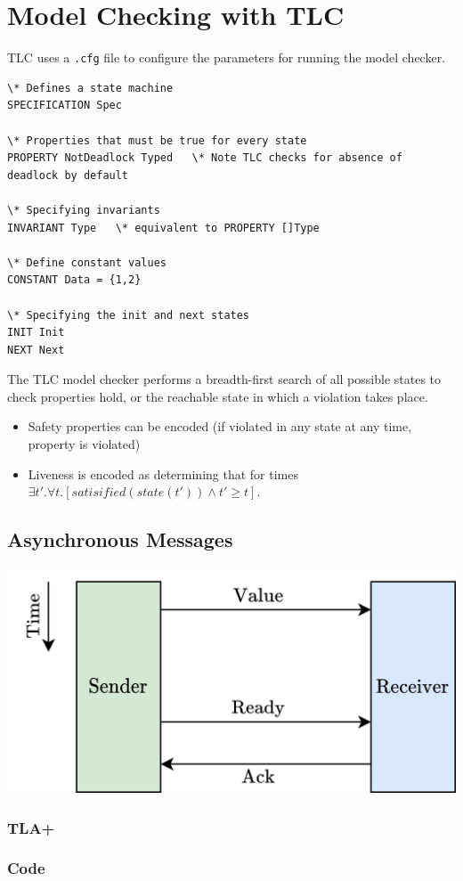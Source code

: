 \section{Model Checking with TLC}
TLC uses a \texttt{.cfg} file to configure the parameters for running the model checker.
\begin{verbatim}
\* Defines a state machine 
SPECIFICATION Spec

\* Properties that must be true for every state
PROPERTY NotDeadlock Typed   \* Note TLC checks for absence of deadlock by default

\* Specifying invariants
INVARIANT Type   \* equivalent to PROPERTY []Type

\* Define constant values
CONSTANT Data = {1,2}

\* Specifying the init and next states
INIT Init
NEXT Next
\end{verbatim}
The TLC model checker performs a breadth-first search of all possible states to check properties hold, or the reachable state in which a violation takes place.
\begin{itemize}
    \item Safety properties can be encoded (if violated in any state at any time, property is violated)
    \item Liveness is encoded as determining that for times $\exists t' . \forall t. [satisified(state(t')) \land t' \geq t]$.
\end{itemize}

\subsection{Asynchronous Messages}
\begin{center}
    \includegraphics[width=.5\textwidth]{tla_plus/images/async_msg.drawio.png}
\end{center}
\subsubsection{TLA+}

\subsubsection{Code}
\inputminted{text}{tla_plus/code/AsyncMessage.tla}
